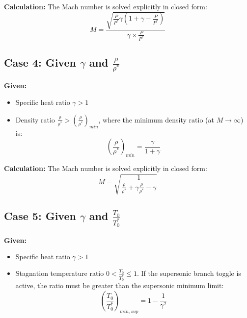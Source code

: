 \textbf{Calculation:} The Mach number is solved explicitly in closed form:
\begin{equation}
M = \frac{\sqrt{\frac{P}{P^*}\gamma\left(1+\gamma-\frac{P}{P^*}\right)}}{\gamma\times\frac{P}{P^*}}
\end{equation}


\subsection*{Case 4: Given $\gamma$ and $\frac{\rho}{\rho^*}$}

\textbf{Given:}
\begin{itemize}[nosep]
    \item Specific heat ratio $\gamma > 1$
    \item Density ratio $\frac{\rho}{\rho^*} > \left(\frac{\rho}{\rho^*}\right)_{min}$, where the minimum density ratio (at $M \to \infty$) is:
    \begin{equation}
    \left(\frac{\rho}{\rho^*}\right)_{min} = \frac{\gamma}{1+\gamma}
    \end{equation}
\end{itemize}

\textbf{Calculation:} The Mach number is solved explicitly in closed form:
\begin{equation}
M = \sqrt{\frac{1}{\frac{\rho}{\rho^*}+\gamma\frac{\rho}{\rho^*}-\gamma}}
\end{equation}


\subsection*{Case 5: Given $\gamma$ and $\frac{T_0}{T_0^*}$}

\textbf{Given:}
\begin{itemize}[nosep]
    \item Specific heat ratio $\gamma > 1$
    \item Stagnation temperature ratio $0 < \frac{T_0}{T_0^*} \le 1$. If the supersonic branch toggle is active, the ratio must be greater than the supersonic minimum limit:
    \begin{equation}
    \left(\frac{T_0}{T_0^*}\right)_{min,sup} = 1 - \frac{1}{\gamma^2}
    \end{equation}
\end{itemize}

